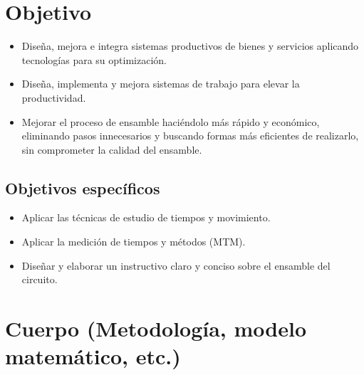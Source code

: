     \section{Objetivo}
    
    \begin{itemize}
        \item Diseña, mejora e integra sistemas productivos de bienes y servicios aplicando tecnologías para su optimización. 
        \item Diseña, implementa y mejora sistemas de trabajo para elevar la productividad.
        \item Mejorar el proceso de ensamble haciéndolo más rápido y económico, eliminando pasos innecesarios y buscando formas más eficientes de realizarlo, sin comprometer la calidad del ensamble. 
    \end{itemize}
     
    
    \subsection{Objetivos específicos }
    
    \begin{itemize}
        \item Aplicar las técnicas de estudio de tiempos y movimiento.
        \item Aplicar la medición de tiempos y métodos (MTM).
        \item Diseñar y elaborar un instructivo claro y conciso sobre el ensamble del circuito. 
    \end{itemize}
    
    \section{Cuerpo (Metodología, modelo matemático, etc.)}
    
